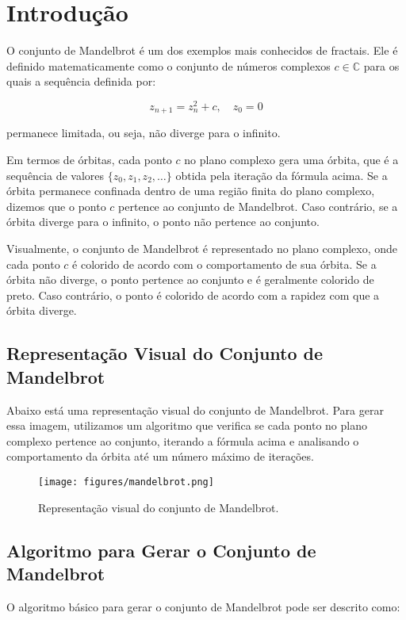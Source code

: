 \section{Introdução}
O conjunto de Mandelbrot é um dos exemplos mais conhecidos de fractais. Ele é definido matematicamente como o conjunto de números complexos $c \in \mathbb{C}$ para os quais a sequência definida por:

\[
z_{n+1} = z_n^2 + c, \quad z_0 = 0
\]

permanece limitada, ou seja, não diverge para o infinito.

Em termos de órbitas, cada ponto $c$ no plano complexo gera uma órbita, que é a sequência de valores $\{z_0, z_1, z_2, \dots\}$ obtida pela iteração da fórmula acima. Se a órbita permanece confinada dentro de uma região finita do plano complexo, dizemos que o ponto $c$ pertence ao conjunto de Mandelbrot. Caso contrário, se a órbita diverge para o infinito, o ponto não pertence ao conjunto.

Visualmente, o conjunto de Mandelbrot é representado no plano complexo, onde cada ponto $c$ é colorido de acordo com o comportamento de sua órbita. Se a órbita não diverge, o ponto pertence ao conjunto e é geralmente colorido de preto. Caso contrário, o ponto é colorido de acordo com a rapidez com que a órbita diverge.

\subsection{Representação Visual do Conjunto de Mandelbrot}

Abaixo está uma representação visual do conjunto de Mandelbrot. Para gerar essa imagem, utilizamos um algoritmo que verifica se cada ponto no plano complexo pertence ao conjunto, iterando a fórmula acima e analisando o comportamento da órbita até um número máximo de iterações.

\begin{figure}[h!]
\centering
\texttt{[image: figures/mandelbrot.png]}
\caption{Representação visual do conjunto de Mandelbrot.}
\label{fig:mandelbrot}
\end{figure}

\subsection{Algoritmo para Gerar o Conjunto de Mandelbrot}

O algoritmo básico para gerar o conjunto de Mandelbrot pode ser descrito como:

